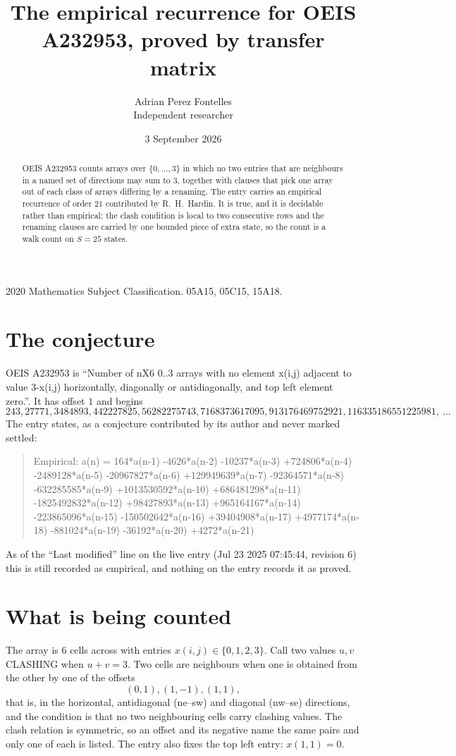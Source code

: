 \documentclass[11pt,a4paper]{article}
\title{The empirical recurrence for OEIS A232953, proved by transfer matrix}
\author{Adrian Perez Fontelles\\ \small Independent researcher}
\date{3 September 2026}
\theoremstyle{plain}
\theoremstyle{definition}
\begin{document}
\maketitle

\begin{abstract}
OEIS A232953 counts arrays over $\{0,\dots,3\}$ in which no two entries that are neighbours in
a named set of directions may sum to $3$, together with clauses that pick one array out of
each class of arrays differing by a renaming. The entry carries an empirical recurrence of
order $21$ contributed by R.~H.~Hardin. It is true, and it is decidable rather than
empirical: the clash condition is local to two consecutive rows and the renaming clauses are
carried by one bounded piece of extra state, so the count is a walk count on $S=25$ states.
\end{abstract}

\noindent\small 2020 Mathematics Subject Classification. 05A15, 05C15, 15A18.\normalsize

\section{The conjecture}

OEIS A232953 is ``Number of nX6 0..3 arrays with no element x(i,j) adjacent to value 3-x(i,j) horizontally, diagonally or antidiagonally, and top left element zero.''. It has offset $1$ and begins
\[
243, 27771, 3484893, 442227825, 56282275743, 7168373617095, 913176469752921, 116335186551225981,\ \dots
\]
The entry states, as a conjecture contributed by its author and never marked settled:
\begin{quote}
Empirical: a(n) = 164*a(n-1) -4626*a(n-2) -10237*a(n-3) +724806*a(n-4) -2489128*a(n-5) -20967827*a(n-6) +129949639*a(n-7) -92364571*a(n-8) -632285585*a(n-9) +1013530592*a(n-10) +686481298*a(n-11) -1825492832*a(n-12) +98427893*a(n-13) +965164167*a(n-14) -223865096*a(n-15) -150502642*a(n-16) +39404908*a(n-17) +4977174*a(n-18) -881024*a(n-19) -36192*a(n-20) +4272*a(n-21)
\end{quote}
As of the ``Last modified'' line on the live entry (Jul 23 2025 07:45:44, revision 6) this is still
recorded as empirical, and nothing on the entry records it as proved.

\section{What is being counted}

The array is $6$ cells across with entries $x(i,j)\in\{0,1,2,3\}$. Call two values $u,v$ CLASHING
when $u+v=3$. Two cells are neighbours when one is obtained from the other by one of
the offsets
\[
(0,1), (1,-1), (1,1),
\]
that is, in the horizontal, antidiagonal (ne--sw) and diagonal (nw--se) directions, and the condition is that no two neighbouring cells carry
clashing values. The clash relation is symmetric, so an offset and its negative name the
same pairs and only one of each is listed. The entry also fixes the top left entry: $x(1,1)=0$.
\end{document}
